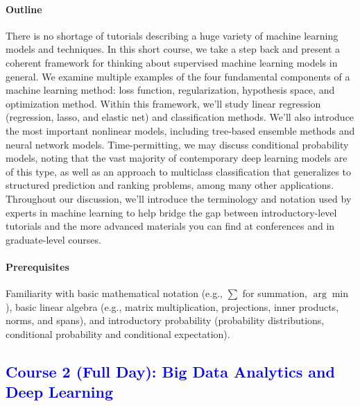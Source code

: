 \documentclass[11pt]{article}
\newcommand{\blue}[1]{{\textcolor{blue}{#1}}}
\begin{document}
\paragraph{Outline}
There is no shortage of tutorials describing a huge variety of machine
learning models and techniques. In this short course, we take a step
back and present a coherent framework for thinking about supervised
machine learning models in general. We examine multiple examples of
the four fundamental components of a machine learning method: loss
function, regularization, hypothesis space, and optimization
method. Within this framework, we'll study linear regression
(regression, lasso, and elastic net) and classification methods. We'll
also introduce the most important nonlinear models, including
tree-based ensemble methods and neural network
models. Time-permitting, we may discuss conditional probability
models, noting that the vast majority of contemporary deep learning
models are of this type, as well as an approach to multiclass
classification that generalizes to structured prediction and ranking
problems, among many other applications. Throughout our discussion,
we'll introduce the terminology and notation used by experts in
machine learning to help bridge the gap between introductory-level
tutorials and the more advanced materials you can find at conferences
and in graduate-level courses.

\paragraph{Prerequisites}
Familiarity with basic mathematical notation (e.g., $\sum$ for summation,
$\arg\min$), basic linear algebra (e.g., matrix multiplication,
projections, inner products, norms, and spans), and introductory
probability (probability distributions, conditional probability and
conditional expectation).

\subsection*{\blue{Course 2 (Full Day): Big Data Analytics and Deep
  Learning}}
\end{document}
